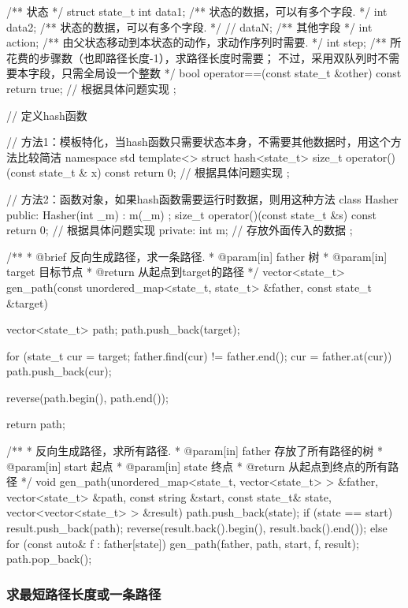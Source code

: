 \begin{Codex}[label=bfs_common.h]
/** 状态 */
struct state_t {
    int data1;  /** 状态的数据，可以有多个字段. */
    int data2;  /** 状态的数据，可以有多个字段. */
    // dataN;   /** 其他字段 */
    int action; /** 由父状态移动到本状态的动作，求动作序列时需要. */
    int step;  /** 所花费的步骤数（也即路径长度-1），求路径长度时需要；
                    不过，采用双队列时不需要本字段，只需全局设一个整数 */
    bool operator==(const state_t &other) const {
        return true;  // 根据具体问题实现
    }
};

// 定义hash函数

// 方法1：模板特化，当hash函数只需要状态本身，不需要其他数据时，用这个方法比较简洁
namespace std {
template<> struct hash<state_t> {
    size_t operator()(const state_t & x) const {
        return 0; // 根据具体问题实现
    }
};
}

// 方法2：函数对象，如果hash函数需要运行时数据，则用这种方法
class Hasher {
public:
    Hasher(int _m) : m(_m) {};
    size_t operator()(const state_t &s) const {
        return 0; // 根据具体问题实现
    }
private:
    int m; // 存放外面传入的数据
};

/**
 * @brief 反向生成路径，求一条路径.
 * @param[in] father 树
 * @param[in] target 目标节点
 * @return 从起点到target的路径
 */
vector<state_t> gen_path(const unordered_map<state_t, state_t> &father,
        const state_t &target) {
    vector<state_t> path;
    path.push_back(target);

    for (state_t cur = target; father.find(cur) != father.end(); 
            cur = father.at(cur))
        path.push_back(cur);

    reverse(path.begin(), path.end());

    return path;
}

/**
 * 反向生成路径，求所有路径.
 * @param[in] father 存放了所有路径的树
 * @param[in] start 起点
 * @param[in] state 终点
 * @return 从起点到终点的所有路径
 */
void gen_path(unordered_map<state_t, vector<state_t> > &father,
        vector<state_t> &path, const string &start, const state_t& state,
        vector<vector<state_t> > &result) {
    path.push_back(state);
    if (state == start) {
        result.push_back(path);
        reverse(result.back().begin(), result.back().end());
    } else {
        for (const auto& f : father[state]) {
            gen_path(father, path, start, f, result);
        }
    }
    path.pop_back();
}
\end{Codex}


\subsubsection{求最短路径长度或一条路径}

